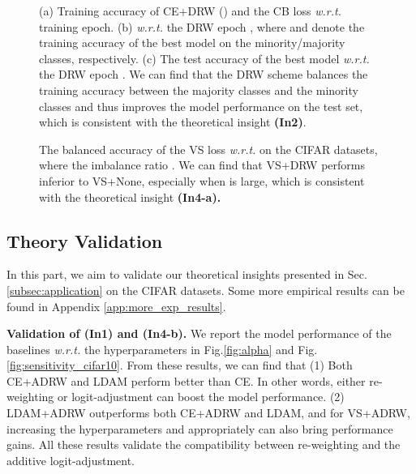 \begin{figure}[t]
    \centering
    \caption{(a) Training accuracy of CE+DRW () and the CB loss \textit{w.r.t.} training epoch. (b)  \textit{w.r.t.} the DRW epoch , where  and  denote the training accuracy of the best model on the minority/majority classes, respectively. (c) The test accuracy of the best model \textit{w.r.t.} the DRW epoch . We can find that the DRW scheme balances the training accuracy between the majority classes and the minority classes and thus improves the model performance on the test set, which is consistent with the theoretical insight \textbf{(In2)}.}
    \label{fig:drw_cifar100}
\end{figure}

\begin{figure}[t]
    \centering
    \caption{The balanced accuracy of the VS loss \textit{w.r.t.}  on the CIFAR datasets, where the imbalance ratio . We can find that VS+DRW performs inferior to VS+None, especially when  is large, which is consistent with the theoretical insight \textbf{(In4-a).}}
    \label{fig:gamma}
\end{figure}

\subsection{Theory Validation}
\label{subsec:theory_validation}
In this part, we aim to validate our theoretical insights presented in Sec.\ref{subsec:application} on the CIFAR datasets. Some more empirical results can be found in Appendix \ref{app:more_exp_results}.

\textbf{Validation of (In1) and (In4-b).} We report the model performance of the baselines \textit{w.r.t.} the hyperparameters in Fig.\ref{fig:alpha} and Fig.\ref{fig:sensitivity_cifar10}. From these results, we can find that (1) Both {\color[RGB]{255, 221, 129} CE+ADRW} and {\color[RGB]{94, 227, 206} LDAM} perform better than {\color[RGB]{127, 231, 153} CE}. In other words, either re-weighting or logit-adjustment can boost the model performance. (2) {\color[RGB]{252, 136, 123} LDAM+ADRW} outperforms both {\color[RGB]{255, 221, 149} CE+ADRW} and {\color[RGB]{94, 227, 206} LDAM}, and for VS+ADRW, increasing the hyperparameters  and  appropriately can also bring performance gains. All these results validate the compatibility between re-weighting and the additive logit-adjustment.


